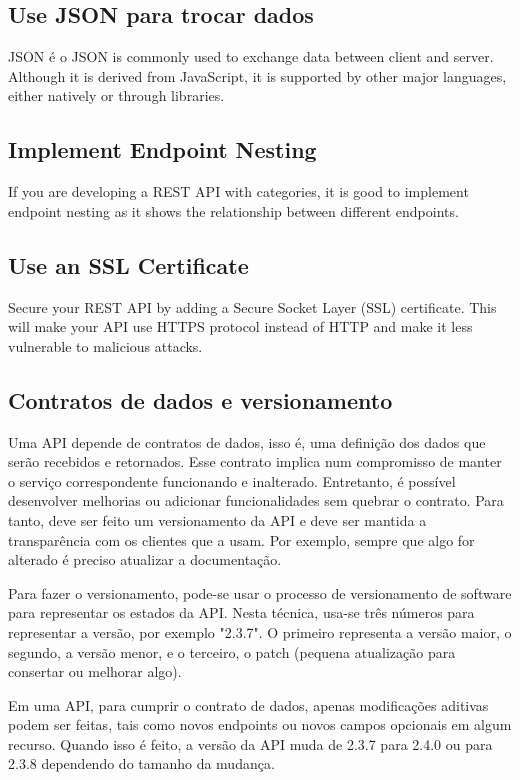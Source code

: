 \subsection{Use JSON para trocar dados}
JSON é o 
JSON is commonly used to exchange data between client and server. 
Although it is derived from JavaScript, it is supported by other major languages, either natively or through libraries. \cite{rapidAPI-twitter}

\subsection{Implement Endpoint Nesting}
If you are developing a REST API with categories, it is good to implement endpoint nesting as it shows the relationship between different endpoints. \cite{rapidAPI-twitter}

\subsection{Use an SSL Certificate}
Secure your REST API by adding a Secure Socket Layer (SSL) certificate.
This will make your API use HTTPS protocol instead of HTTP and make it less vulnerable to malicious attacks. \cite{rapidAPI-twitter}

\subsection{Contratos de dados e versionamento}
Uma API depende de contratos de dados, isso é, uma definição dos dados que serão recebidos e retornados. Esse contrato implica num compromisso de manter o serviço correspondente funcionando e inalterado. Entretanto, é possível desenvolver melhorias ou adicionar funcionalidades sem quebrar o contrato. Para tanto, deve ser feito um versionamento da API e deve ser mantida a transparência com os clientes que a usam. Por exemplo, sempre que algo for alterado é preciso atualizar a documentação.

Para fazer o versionamento, pode-se usar o processo de versionamento de software para representar os estados da API. Nesta técnica, usa-se três números para representar a versão, por exemplo "2.3.7". O primeiro representa a versão maior, o segundo, a versão menor, e o terceiro, o patch (pequena atualização para consertar ou melhorar algo). \cite{wiki_software_versioning_2022}

Em uma API, para cumprir o contrato de dados, apenas modificações aditivas podem ser feitas, tais como novos endpoints ou novos campos opcionais em algum recurso. Quando isso é feito, a versão da API muda de 2.3.7 para 2.4.0 ou para 2.3.8 dependendo do tamanho da mudança.

